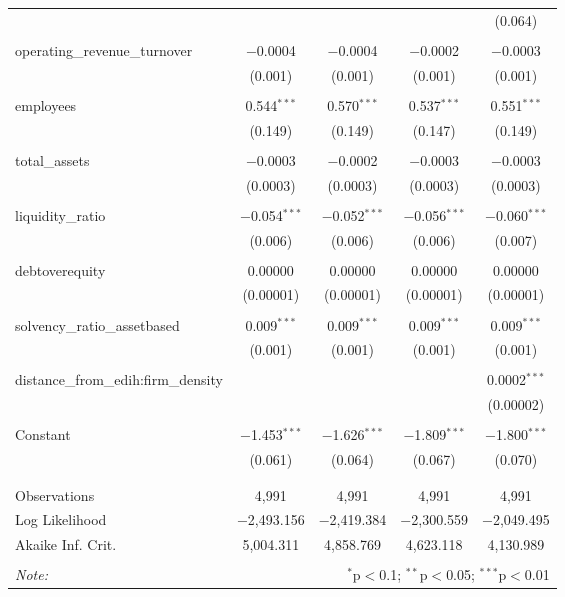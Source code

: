 \documentclass{article}
\begin{document}
\begin{table}[!htbp]
\begin{tabular}{@{\extracolsep{5pt}}lcccc}
   &  &  &  & (0.064) \\ 
   & & & & \\ 
  operating\_revenue\_turnover & $-$0.0004 & $-$0.0004 & $-$0.0002 & $-$0.0003 \\ 
   & (0.001) & (0.001) & (0.001) & (0.001) \\ 
   & & & & \\ 
  employees & 0.544$^{***}$ & 0.570$^{***}$ & 0.537$^{***}$ & 0.551$^{***}$ \\ 
   & (0.149) & (0.149) & (0.147) & (0.149) \\ 
   & & & & \\ 
  total\_assets & $-$0.0003 & $-$0.0002 & $-$0.0003 & $-$0.0003 \\ 
   & (0.0003) & (0.0003) & (0.0003) & (0.0003) \\ 
   & & & & \\ 
  liquidity\_ratio & $-$0.054$^{***}$ & $-$0.052$^{***}$ & $-$0.056$^{***}$ & $-$0.060$^{***}$ \\ 
   & (0.006) & (0.006) & (0.006) & (0.007) \\ 
   & & & & \\ 
  debtoverequity & 0.00000 & 0.00000 & 0.00000 & 0.00000 \\ 
   & (0.00001) & (0.00001) & (0.00001) & (0.00001) \\ 
   & & & & \\ 
  solvency\_ratio\_assetbased & 0.009$^{***}$ & 0.009$^{***}$ & 0.009$^{***}$ & 0.009$^{***}$ \\ 
   & (0.001) & (0.001) & (0.001) & (0.001) \\ 
   & & & & \\ 
  distance\_from\_edih:firm\_density &  &  &  & 0.0002$^{***}$ \\ 
   &  &  &  & (0.00002) \\ 
   & & & & \\ 
  Constant & $-$1.453$^{***}$ & $-$1.626$^{***}$ & $-$1.809$^{***}$ & $-$1.800$^{***}$ \\ 
   & (0.061) & (0.064) & (0.067) & (0.070) \\ 
   & & & & \\ 
 \hline \\[-1.8ex] 
 Observations & 4,991 & 4,991 & 4,991 & 4,991 \\ 
 Log Likelihood & $-$2,493.156 & $-$2,419.384 & $-$2,300.559 & $-$2,049.495 \\ 
 Akaike Inf. Crit. & 5,004.311 & 4,858.769 & 4,623.118 & 4,130.989 \\ 
 \hline 
 \hline \\[-1.8ex] 
 \textit{Note:}  & \multicolumn{4}{r}{$^{*}$p$<$0.1; $^{**}$p$<$0.05; $^{***}$p$<$0.01} \\ 
 \end{tabular} 
 \end{table}

\nocite{*}
\printbibliography
\end{document}
